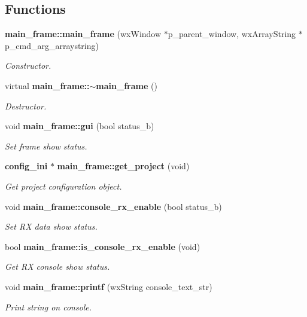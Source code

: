 \subsection*{Functions}
\begin{DoxyCompactItemize}
\item 
\textbf{ main\+\_\+frame\+::main\+\_\+frame} (wx\+Window $\ast$p\+\_\+parent\+\_\+window, wx\+Array\+String $\ast$p\+\_\+cmd\+\_\+arg\+\_\+arraystring)
\begin{DoxyCompactList}\small\item\em Constructor. \end{DoxyCompactList}\item 
virtual \textbf{ main\+\_\+frame\+::$\sim$main\+\_\+frame} ()
\begin{DoxyCompactList}\small\item\em Destructor. \end{DoxyCompactList}\item 
void \textbf{ main\+\_\+frame\+::gui} (bool status\+\_\+b)
\begin{DoxyCompactList}\small\item\em Set frame show status. \end{DoxyCompactList}\item 
\textbf{ config\+\_\+ini} $\ast$ \textbf{ main\+\_\+frame\+::get\+\_\+project} (void)
\begin{DoxyCompactList}\small\item\em Get project configuration object. \end{DoxyCompactList}\item 
void \textbf{ main\+\_\+frame\+::console\+\_\+rx\+\_\+enable} (bool status\+\_\+b)
\begin{DoxyCompactList}\small\item\em Set RX data show status. \end{DoxyCompactList}\item 
bool \textbf{ main\+\_\+frame\+::is\+\_\+console\+\_\+rx\+\_\+enable} (void)
\begin{DoxyCompactList}\small\item\em Get RX console show status. \end{DoxyCompactList}\item 
void \textbf{ main\+\_\+frame\+::printf} (wx\+String console\+\_\+text\+\_\+str)
\begin{DoxyCompactList}\small\item\em Print string on console. \end{DoxyCompactList}\item 

\end{DoxyCompactItemize}
